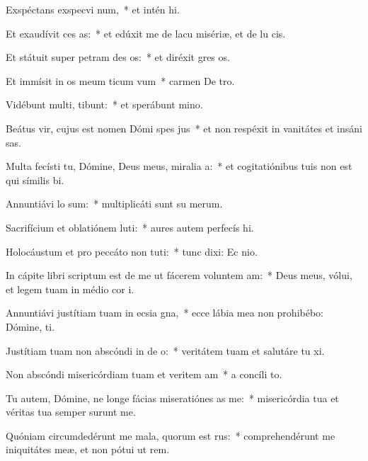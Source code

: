 \item Exspéctans exspecvi num,~* et intén hi.
\item Et exaudívit ces as:~* et edúxit me de lacu misériæ, et de lu cis.
\item Et státuit super petram des os:~* et diréxit gres os.
\item Et immísit in os meum ticum vum~* carmen De tro.
\item Vidébunt multi,  tibunt:~* et sperábunt  mino.
\item Beátus vir, cujus est nomen Dómi spes jus~* et non respéxit in vanitátes et insáni sas.
\item Multa fecísti tu, Dómine, Deus meus, miralia a:~* et cogitatiónibus tuis non est qui símilis  bi.
\item Annuntiávi  lo sum:~* multiplicáti sunt su merum.
\item Sacrifícium et oblatiónem luti:~* aures autem perfecís hi.
\item Holocáustum et pro peccáto non tuti:~* tunc dixi: Ec nio.
\item In cápite libri scriptum est de me ut fácerem voluntem am:~* Deus meus, vólui, et legem tuam in médio cor i.
\item Annuntiávi justítiam tuam in ecsia gna,~* ecce lábia mea non prohibébo: Dómine,  ti.
\item Justítiam tuam non abscóndi in de o:~* veritátem tuam et salutáre tu xi.
\item Non abscóndi misericórdiam tuam et veritem am~* a concíli to.
\item Tu autem, Dómine, ne longe fácias miseratiónes as  me:~* misericórdia tua et véritas tua semper surunt me.
\item Quóniam circumdedérunt me mala, quorum  est rus:~* comprehendérunt me iniquitátes meæ, et non pótui ut rem.
